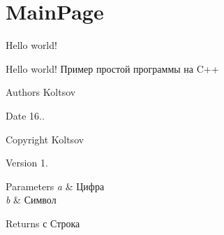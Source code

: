 \chapter{Main\+Page}
\hypertarget{index}{}\label{index}
Hello world!

Hello world! Пример простой программы на C++ \begin{DoxyAuthor}{Authors}
Koltsov 
\end{DoxyAuthor}
\begin{DoxyDate}{Date}
16.. 
\end{DoxyDate}
\begin{DoxyCopyright}{Copyright}
Koltsov 
\end{DoxyCopyright}
\begin{DoxyVersion}{Version}
1.
\end{DoxyVersion}

\begin{DoxyParams}{Parameters}
{\em a} & Цифра \\
\hline
{\em b} & Символ \\
\hline
\end{DoxyParams}
\begin{DoxyReturn}{Returns}
с Строка 
\end{DoxyReturn}
